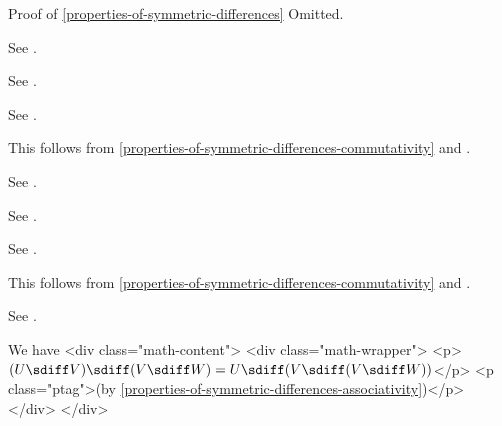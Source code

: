 \begin{Proof}{Proof of \cref{properties-of-symmetric-differences}}%
    Omitted.

    See \cite{proof-wiki:equivalence-of-definitions-of-symmetric-difference}.

    See \cite{proof-wiki:symmetric-difference-is-associative}.

    See \cite{proof-wiki:symmetric-difference-is-commutative}.

    This follows from \cref{properties-of-symmetric-differences-commutativity} and \cite{proof-wiki:symmetric-difference-with-empty-set}.

    See \cite{proof-wiki:symmetric-difference-with-self-is-empty-set}.

    See \cite{proof-wiki:union-of-symmetric-differences}.

    See \cite{proof-wiki:symmetric-difference-with-complement}.

    This follows from \cref{properties-of-symmetric-differences-commutativity} and \cite{proof-wiki:symmetric-difference-with-universe}.

    See \cite{proof-wiki:symmetric-difference-of-complements}.

    We have
    <div class="math-content">
        <div class="math-wrapper">
            <p>$(U\sdiff V)\sdiff(V\sdiff W) = U\sdiff(V\sdiff(V\sdiff W))$</p>
            <p class="ptag">(by \cref{properties-of-symmetric-differences-associativity})</p>
        </div>
    </div>


\end{Proof}
